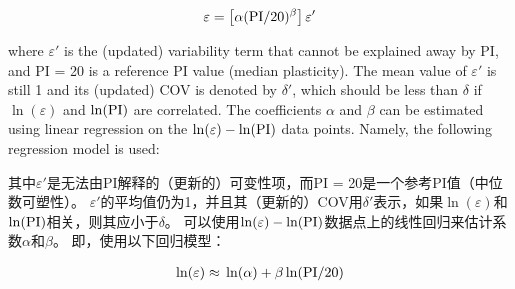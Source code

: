 \begin{align}
    \varepsilon=\left[\alpha(\rm{PI}/20)^\beta\right]\varepsilon'
    \label{equation:4}
\end{align}

\begin{paracol}{2}
     where $\varepsilon'$ is the (updated) variability term that cannot be explained away by PI, and PI = 20 is a reference PI value (median plasticity). The mean value of $\varepsilon'$ is still 1 and its (updated) COV is denoted by $\delta'$, which should be less than $\delta$ if $\ln(\varepsilon)$ and $\ln(\rm{PI})$ are correlated. The coefficients $\alpha$ and $\beta$ can be estimated using linear regression on the $\ln(\varepsilon)-\ln(\rm{PI})$ data points. Namely, the following regression model is used:

    \switchcolumn

    其中$\varepsilon'$是无法由PI解释的（更新的）可变性项，而PI = 20是一个参考PI值（中位数可塑性）。 $\varepsilon'$的平均值仍为1，并且其（更新的）COV用$\delta'$表示，如果$\ln(\varepsilon)$和$\ln(\rm{PI})$相关，则其应小于$\delta$。 可以使用$\ln(\varepsilon)-\ln(\rm{PI})$数据点上的线性回归来估计系数$\alpha$和$\beta$。 即，使用以下回归模型：

\end{paracol}

\begin{align}
    \ln(\varepsilon)\approx{}\ln(\alpha)+\beta\ln(\rm{PI}/20)
    \label{equation:5}
\end{align}

